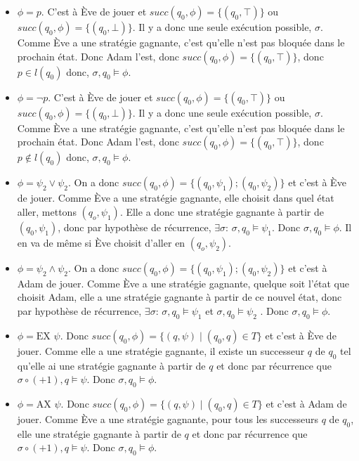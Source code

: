 \documentclass[10pt,a4paper]{article}
\begin{document}
\begin{itemize}
\item $\phi = p$. C'est à Ève de jouer et $succ(q_0,\phi) = \{(q_0, \top)\}$ ou $succ(q_0,\phi) = \{(q_0, \bot)\}$. Il y a donc une seule exécution possible, $\sigma$. Comme Ève a une stratégie gagnante, c'est qu'elle n'est pas bloquée dans le prochain état. Donc Adam l'est, donc $succ(q_0,\phi) = \{(q_0, \top)\}$, donc $p \in l(q_0)$ donc, $\sigma,q_0 \vDash \phi$.

\item $\phi = \neg p$. C'est à Ève de jouer et $succ(q_0,\phi) = \{(q_0, \top)\}$ ou $succ(q_0,\phi) = \{(q_0, \bot)\}$. Il y a donc une seule exécution possible, $\sigma$. Comme Ève a une stratégie gagnante, c'est qu'elle n'est pas bloquée dans le prochain état. Donc Adam l'est, donc $succ(q_0,\phi) = \{(q_0, \top)\}$, donc $p \notin l(q_0)$ donc, $\sigma,q_0 \vDash \phi$.

\item $\phi = \psi_2 \lor \psi_2$. On a donc $succ(q_0,\phi) = \{(q_0, \psi_1); (q_0, \psi_2) \}$ et c'est à Ève de jouer. Comme Ève a une stratégie gagnante, elle choisit dans quel état aller, mettons $(q_o, \psi_1)$. Elle a donc une stratégie gagnante à partir de $(q_0, \psi_1)$, donc par hypothèse de récurrence, $\exists \sigma$: $\sigma,q_0 \vDash \psi_1$. Donc $\sigma,q_0 \vDash \phi$. Il en va de même si Ève choisit d'aller en $(q_o, \psi_2)$.

\item $\phi = \psi_2 \land \psi_2$. On a donc $succ(q_0,\phi) = \{(q_0, \psi_1); (q_0, \psi_2) \}$ et c'est à Adam de jouer. Comme Ève a une stratégie gagnante, quelque soit l'état que choisit Adam, elle a une stratégie gagnante à partir de ce nouvel état, donc par hypothèse de récurrence, $\exists \sigma$: $\sigma,q_0 \vDash \psi_1$ et $\sigma,q_0 \vDash \psi_2$ . Donc $\sigma,q_0 \vDash \phi$.

\item $\phi = \mbox{EX } \psi$. Donc $succ(q_0, \phi) = \{ (q, \psi) \mid (q_0,q) \in T \} $ et c'est à Ève de jouer. Comme elle a une stratégie gagnante, il existe un successeur $q$ de $q_0$ tel qu'elle ai une stratégie gagnante à partir de $q$ et donc par récurrence que $\sigma \circ (+ 1), q \vDash \psi$. Donc $\sigma, q_0 \vDash \phi$.

\item $\phi = \mbox{AX } \psi$. Donc $succ(q_0, \phi) = \{ (q, \psi) \mid (q_0,q) \in T \} $ et c'est à Adam de jouer. Comme Ève a une stratégie gagnante, pour tous les successeurs $q$ de $q_0$, elle une stratégie gagnante à partir de $q$ et donc par récurrence que $\sigma \circ (+ 1), q \vDash \psi$. Donc $\sigma, q_0 \vDash \phi$.
\end{itemize}
\end{document}
